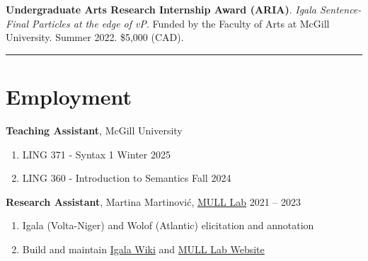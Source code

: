 \documentclass[margin,line]{resume}
\begin{document}
\begin{resume}
\newpage

		{\textbf{Undergraduate Arts Research Internship Award (ARIA)}. \textit{Igala Sentence-Final Particles at the edge of \textit{v}P}. Funded by the Faculty of Arts at McGill University. %
		Summer 2022. \$5,000 (CAD).}
	
		\vspace{-0.7em}\rule{\textwidth}{0.4pt}


	\vspace{-0.5em}


	\section{\mysidestyle Employment}

	\textbf{Teaching Assistant}, 
	McGill University
	\begin{enumerate}[-, leftmargin=1em, topsep=2pt]
		\item[] LING 371 - Syntax 1 \hfill Winter 2025
		\item[] LING 360 - Introduction to Semantics \hfill Fall 2024
	\end{enumerate}


	\textbf{Research Assistant}, Martina Martinović, \href{https://mull-lab.org/}{MULL Lab} \hfill 2021 -- 2023
	\begin{enumerate}[-, leftmargin=1em, topsep=2pt]
		\item[] Igala (Volta-Niger) and Wolof (Atlantic) elicitation and annotation
		\item[] Build and maintain \href{https://wiki.mull-lab.org/Igala/}{Igala Wiki} and \href{https://mull-lab.org/}{MULL Lab Website}%
	\end{enumerate}%

	\begin{comment}
	\textbf{Full Stack and Mobile Developer}, \href{https://playmind.com/}{PLAYMIND}, Montr\'{e}al \hfill Mar -- Aug 2021
	\begin{enumerate}[-, leftmargin=1em, topsep=2pt]
		\item[] Developed~\href{https://playbox.games/\#home}{
			      PLAYBOX online management portal and Android App}
	\end{enumerate}


\end{comment}
\end{resume}
\end{document}
